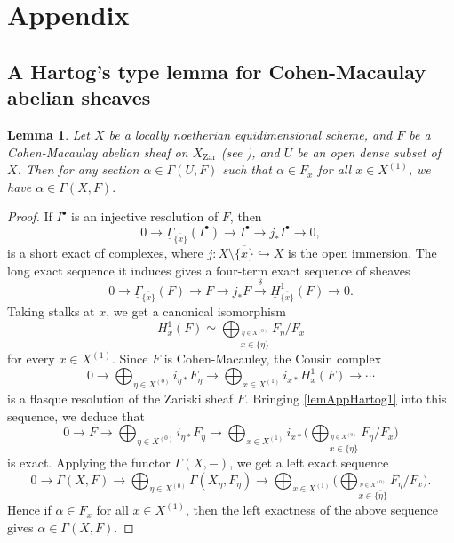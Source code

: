 \documentclass[11pt]{amsart}
\newcommand{\eq}[2]{\begin{equation}\label{#1}#2 \end{equation}}
\newcommand{\ra}{\rightarrow}
\newcommand{\xra}{\xrightarrow}
\newcommand{\hra}{\hookrightarrow}
\newcommand{\Zar}{{\operatorname{Zar}}}
\newcommand{\ul}{\underline}
\renewcommand{\bar}{\overline}
\theoremstyle{plain}
\newtheorem{lem}[prop]{Lemma}
\theoremstyle{definition}
\numberwithin{equation}{prop}
\begin{document}
\section{Appendix}
\subsection{A Hartog's type lemma for Cohen-Macaulay abelian sheaves}
\begin{lem}
\label{lemAppHartog}
Let $X$ be a locally noetherian equidimensional scheme, and
$F$ be a Cohen-Macaulay abelian sheaf on $X_\Zar$ (see \cite[Definition and Remark on p.238]{Ha66}), and $U$ be an open dense subset of $X$. Then for any section $\alpha\in \Gamma(U,F)$ such that $\alpha\in F_x$ for all $x\in X^{(1)}$, we have $\alpha\in \Gamma(X,F).$ 

\end{lem}
\begin{proof}
If $I^\bullet$ is an injective resolution of $F$, then 
$$0\ra \ul\Gamma_{\bar{\{x\}}}(I^\bullet) \ra I^\bullet\ra j_*I^\bullet
\ra 0,$$
is a short exact of complexes, where $j:X\setminus \bar{\{x\}}\hra X$ is the open immersion. 
The long exact sequence it induces gives a four-term exact sequence of sheaves
$$0\ra \ul\Gamma_{\bar{\{x\}}}(F) \ra F \ra j_*F\xra{\delta} \ul H^1_{\bar{\{x\}}}(F)\ra 0.$$
Taking stalks at $x$, we get a canonical isomorphism
\eq{lemAppHartog1}{H^1_{x}(F)\simeq \bigoplus_{\stackrel{\eta\in X^{(0)}}{x\in\bar{\{\eta\}}}} F_{\eta}/F_{x}}
for every $x\in X^{(1)}$.
Since $F$ is Cohen-Macauley, the Cousin complex
$$0\ra 
\bigoplus_{\eta\in X^{(0)}} i_{\eta*}F_\eta \ra
\bigoplus_{x\in X^{(1)}} i_{x*}  H_x^1(F)\ra\cdots
$$
is a flasque resolution of the Zariski sheaf $F$.
Bringing \eqref{lemAppHartog1} into this sequence, we deduce that
$$0\ra 
F\ra 
\bigoplus_{\eta\in X^{(0)}} i_{\eta*}F_\eta \ra
\bigoplus_{x\in X^{(1)}} i_{x*}\Big(\bigoplus_{\stackrel{\eta\in X^{(0)}}{x\in\bar{\{\eta\}}}} F_{\eta}/F_{x}\Big)
$$
is exact.
Applying the functor $\Gamma(X,-)$, we get a left exact sequence
$$0\ra 
\Gamma(X,F)\ra 
\bigoplus_{\eta\in X^{(0)}} \Gamma(X_\eta ,F_\eta) \ra
\bigoplus_{x\in X^{(1)}} \Big(\bigoplus_{\stackrel{\eta\in X^{(0)}}{x\in\bar{\{\eta\}}}} F_{\eta}/F_{x}\Big).
$$
Hence if $\alpha\in F_x$ for all $x\in X^{(1)}$, then the left exactness of the above sequence gives $\alpha\in \Gamma(X,F)$.
\end{proof}
\end{document}
